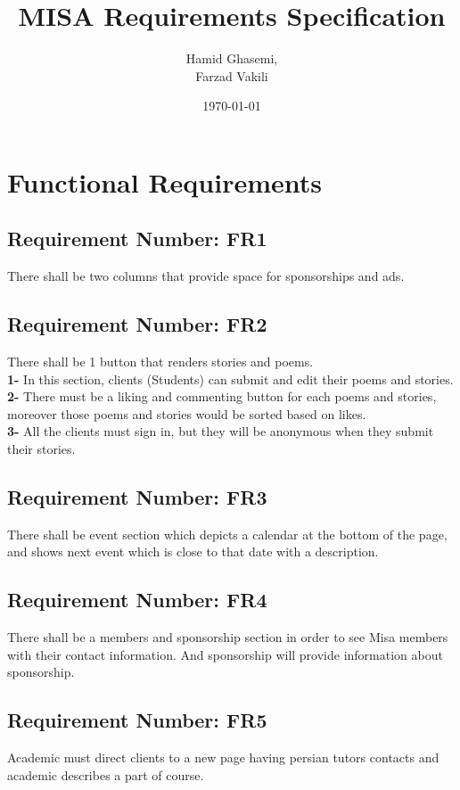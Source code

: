 \documentclass[12pt, titlepage]{article}
\title{MISA Requirements Specification }
\author{Hamid Ghasemi,\\
		Farzad Vakili
}
\date{\today}
\begin{document}
\maketitle
\newpage
{}



\section{Functional Requirements}

\subsection{Requirement Number: FR1}
There shall be two columns that provide space for sponsorships and ads.

\subsection{Requirement Number: FR2}
There shall be 1 button that renders stories and poems.\\
\indent \textbf{1-} In this section, clients (Students) can submit and edit their poems and \indent stories.\\
\indent \textbf{2-} There must be a liking and commenting button for each poems and \indent stories, moreover those poems and stories would be sorted based on likes.\\
\indent \textbf{3-} All the clients must sign in, but they will be anonymous when they \indent submit their stories.

\subsection{Requirement Number: FR3}
There shall be event section which depicts a calendar at the bottom of the page, and shows next event which is close to that date with a description.

\subsection{Requirement Number: FR4}
There shall be a members and sponsorship section in order to see Misa members with their contact information. And sponsorship will provide information about sponsorship.

\subsection{Requirement Number: FR5}
Academic must direct clients to a new page having persian tutors contacts and academic describes a part of course.
\end{document}

